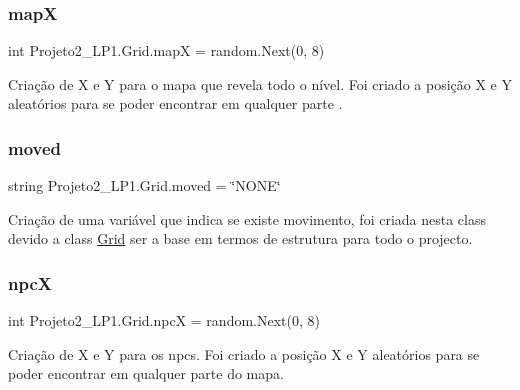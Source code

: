 \subsubsection{\texorpdfstring{mapX}{mapX}}
{\footnotesize\ttfamily int Projeto2\+\_\+\+L\+P1.\+Grid.\+mapX = random.\+Next(0, 8)}



Criação de X e Y para o mapa que revela todo o nível. Foi criado a posição X e Y aleatórios para se poder encontrar em qualquer parte . 

\mbox{\label{class_projeto2___l_p1_1_1_grid_ab758ab4b626f98e3884ef6fcd7cbb429}} 
\subsubsection{\texorpdfstring{moved}{moved}}
{\footnotesize\ttfamily string Projeto2\+\_\+\+L\+P1.\+Grid.\+moved = \char`\"{}N\+O\+NE\char`\"{}}



Criação de uma variável que indica se existe movimento, foi criada nesta class devido a class \mbox{\hyperlink{class_projeto2___l_p1_1_1_grid}{Grid}} ser a base em termos de estrutura para todo o projecto. 

\mbox{\label{class_projeto2___l_p1_1_1_grid_a287fe8d6c874a537ba1191acc155a4a0}} 
\subsubsection{\texorpdfstring{npcX}{npcX}}
{\footnotesize\ttfamily int Projeto2\+\_\+\+L\+P1.\+Grid.\+npcX = random.\+Next(0, 8)}



Criação de X e Y para os npcs. Foi criado a posição X e Y aleatórios para se poder encontrar em qualquer parte do mapa. 

\mbox{\label{class_projeto2___l_p1_1_1_grid_aa0bc3b49820e0d8282128d8fb269437e}} 
